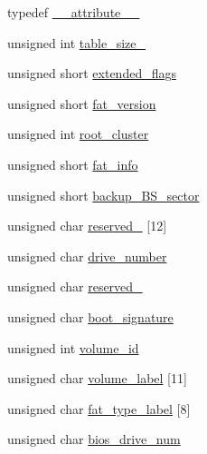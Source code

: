 \begin{DoxyCompactItemize}
\item 
typedef \hyperlink{a00158_a9a3a2a951fb76d806466ff79a3f0d426_a9a3a2a951fb76d806466ff79a3f0d426}{\+\_\+\+\_\+attribute\+\_\+\+\_\+}
\item 
unsigned int \hyperlink{a00158_a8202591d7b2208a5bb4e8c6848531b00_a8202591d7b2208a5bb4e8c6848531b00}{table\+\_\+size\+\_}
\item 
unsigned short \hyperlink{a00158_ae8c15edc2703a5ba547781b864448b0c_ae8c15edc2703a5ba547781b864448b0c}{extended\+\_\+flags}
\item 
unsigned short \hyperlink{a00158_ab4a262a3a624c702e31a66fd3602a60d_ab4a262a3a624c702e31a66fd3602a60d}{fat\+\_\+version}
\item 
unsigned int \hyperlink{a00158_a33393065e24bc94ce2089fb86245206a_a33393065e24bc94ce2089fb86245206a}{root\+\_\+cluster}
\item 
unsigned short \hyperlink{a00158_a5515272b43d122d7239d4996216e9080_a5515272b43d122d7239d4996216e9080}{fat\+\_\+info}
\item 
unsigned short \hyperlink{a00158_aa5aeb1cf34efa1857e5384685d938548_aa5aeb1cf34efa1857e5384685d938548}{backup\+\_\+\+B\+S\+\_\+sector}
\item 
unsigned char \hyperlink{a00158_a9be1862088e39957378b98c43222fc0d_a9be1862088e39957378b98c43222fc0d}{reserved\+\_} \mbox{[}12\mbox{]}
\item 
unsigned char \hyperlink{a00158_ace7cd596c41a03630b828ad71042c645_ace7cd596c41a03630b828ad71042c645}{drive\+\_\+number}
\item 
unsigned char \hyperlink{a00158_aed9514b6f698ccf6462bd8b35a6adbad_aed9514b6f698ccf6462bd8b35a6adbad}{reserved\+\_}
\item 
unsigned char \hyperlink{a00158_acd0f56b390c96dd1fc27c96d932583cc_acd0f56b390c96dd1fc27c96d932583cc}{boot\+\_\+signature}
\item 
unsigned int \hyperlink{a00158_a35fa9e629267c027e1e46e4b354b6764_a35fa9e629267c027e1e46e4b354b6764}{volume\+\_\+id}
\item 
unsigned char \hyperlink{a00158_ac1eef402f95fa102ed4c38f0c791c1c1_ac1eef402f95fa102ed4c38f0c791c1c1}{volume\+\_\+label} \mbox{[}11\mbox{]}
\item 
unsigned char \hyperlink{a00158_a587b2173d93330812c7d467613e05372_a587b2173d93330812c7d467613e05372}{fat\+\_\+type\+\_\+label} \mbox{[}8\mbox{]}
\item 
unsigned char \hyperlink{a00158_ad9190db73466d476ce9c6d7edb2a23d5_ad9190db73466d476ce9c6d7edb2a23d5}{bios\+\_\+drive\+\_\+num}

\end{DoxyCompactItemize}
